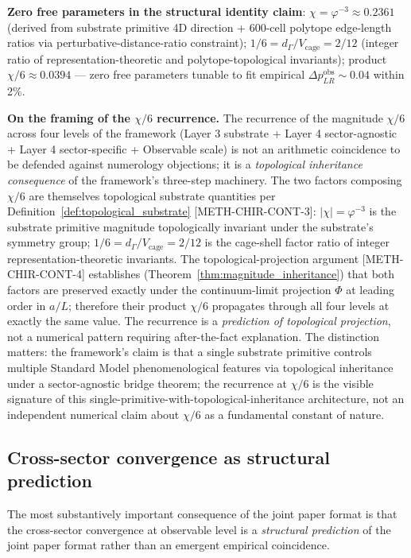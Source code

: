 \documentclass[11pt,letterpaper]{article}
\newcommand{\DeltapLR}{\Delta p_{LR}}
\newcommand{\Vcage}{V_{\text{cage}}}
\newcommand{\dGamma}{d_\Gamma}
\newcommand{\methref}[1]{\textsf{\small[\textsc{#1}]}}
\begin{document}
\textbf{Zero free parameters in the structural identity claim}: $\chi = \varphi^{-3} \approx 0.2361$ (derived from substrate primitive 4D direction + 600-cell polytope edge-length ratios via perturbative-distance-ratio constraint); $1/6 = \dGamma/\Vcage = 2/12$ (integer ratio of representation-theoretic and polytope-topological invariants); product $\chi/6 \approx 0.0394$ --- zero free parameters tunable to fit empirical $\DeltapLR^{\text{obs}} \sim 0.04$ within 2\%.

\textbf{On the framing of the $\chi/6$ recurrence.} The recurrence of the magnitude $\chi/6$ across four levels of the framework (Layer 3 substrate + Layer 4 sector-agnostic + Layer 4 sector-specific + Observable scale) is not an arithmetic coincidence to be defended against numerology objections; it is a \emph{topological inheritance consequence} of the framework's three-step machinery. The two factors composing $\chi/6$ are themselves topological substrate quantities per Definition~\ref{def:topological_substrate} \methref{METH-CHIR-CONT-3}: $|\chi| = \varphi^{-3}$ is the substrate primitive magnitude topologically invariant under the substrate's symmetry group; $1/6 = \dGamma/\Vcage = 2/12$ is the cage-shell factor ratio of integer representation-theoretic invariants. The topological-projection argument \methref{METH-CHIR-CONT-4} establishes (Theorem~\ref{thm:magnitude_inheritance}) that both factors are preserved exactly under the continuum-limit projection $\Phi$ at leading order in $a/L$; therefore their product $\chi/6$ propagates through all four levels at exactly the same value. The recurrence is a \emph{prediction of topological projection}, not a numerical pattern requiring after-the-fact explanation. The distinction matters: the framework's claim is that a single substrate primitive controls multiple Standard Model phenomenological features via topological inheritance under a sector-agnostic bridge theorem; the recurrence at $\chi/6$ is the visible signature of this single-primitive-with-topological-inheritance architecture, not an independent numerical claim about $\chi/6$ as a fundamental constant of nature.

\subsection{Cross-sector convergence as structural prediction}
\label{sec:cross_sector_convergence_structural}

The most substantively important consequence of the joint paper format is that the cross-sector convergence at observable level is a \emph{structural prediction} of the joint paper format rather than an emergent empirical coincidence.
\end{document}

